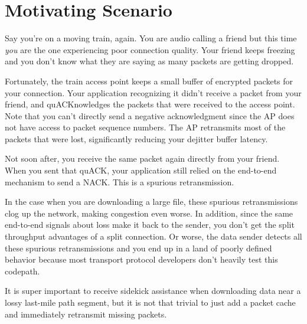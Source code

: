 \section{Motivating Scenario}
\label{sec:motivating}

Say you're on a moving train, again. You are audio calling a friend but this
time \textit{you} are the one experiencing poor connection quality. Your friend
keeps freezing and you don't know what they are saying as many packets are
getting dropped.

Fortunately, the train access point keeps a small buffer of encrypted packets
for your connection. Your application recognizing it didn't receive a packet
from your friend, and quACKnowledges the packets that were received to the
access point. Note that you can't directly send a negative acknowledgment since
the AP does not have access to packet sequence numbers. The AP retransmits most
of the packets that were lost, significantly reducing your dejitter buffer
latency.

Not soon after, you receive the same packet again directly from your friend.
When you sent that quACK, your application still relied on the end-to-end
mechanism to send a NACK. This is a spurious retransmission.

In the case when you are downloading a large file, these spurious
retransmissions clog up the network, making congestion even worse. In addition,
since the same end-to-end signals about loss make it back to the sender, you
don't get the split throughput advantages of a split connection. Or worse, the
data sender detects all these spurious retransmissions and you end up in a land
of poorly defined behavior because most transport protocol developers don't
heavily test this codepath.

It is super important to receive sidekick assistance when downloading data near
a lossy last-mile path segment, but it is not that trivial to just add a packet
cache and immediately retransmit missing packets.